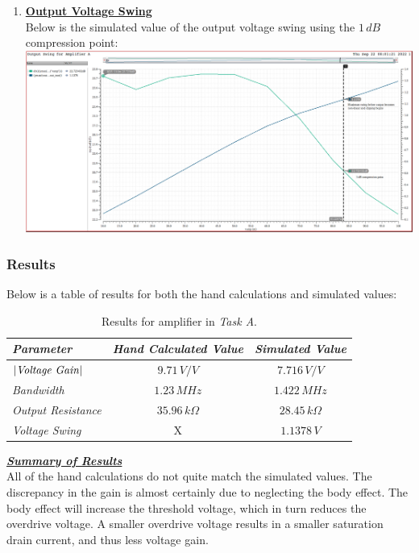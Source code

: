 \documentclass[12pt, fleqn]{article}
\begin{document}
\begin{enumerate}
{    }
    \item
    {
    \textbf{\underline{Output Voltage Swing}}\\[0.25cm]
    Below is the simulated value of the output voltage swing using the $1\,dB$ compression point:\\[0.1cm]
    \includegraphics[scale=0.35, center]{a_swing.png}\\[0.5cm]
    }
\end{enumerate}
\newpage
\subsubsection{Results}
Below is a table of results for both the hand calculations and simulated values:\\[0.25cm]
\begin{table}[H]
\centering
\setlength{\tabcolsep}{20pt}
\renewcommand{\arraystretch}{1.5}
\begin{tabular}{|l|c|c|}
    \hline
    \textbf{\textit{Parameter}} & \textbf{\textit{Hand Calculated Value}} & \textbf{\textit{Simulated Value}}\\
    \hline
    $\left|\text{\textit{Voltage Gain}}\right|$ & $9.71\,V/V$ & $7.716\,V/V$\\
    \hline
    \textit{Bandwidth} & $1.23\,MHz$ & $1.422\,MHz$\\
    \hline
    \textit{Output Resistance} & $35.96\,k\Omega$ & $28.45\,k\Omega$ \\
    \hline
    \textit{Voltage Swing} & X & $1.1378\,V$\\
    \hline
\end{tabular}
\caption{Results for amplifier in \textit{Task A}.}
\end{table}
\noindent
\underline{\textbf{\textit{Summary of Results}}}\\[0.25cm]
All of the hand calculations do not quite match the simulated values.  The discrepancy in the gain is almost certainly due to neglecting the body effect.  The body effect will increase the threshold voltage, which in turn reduces the overdrive voltage.  A smaller overdrive voltage results in a smaller saturation drain current, and thus less voltage gain.
\end{document}
